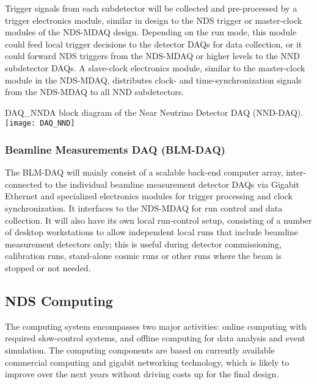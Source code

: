 Trigger signals from each subdetector will be collected and pre-processed by a 
trigger electronics module, similar in design to the NDS  trigger or master-clock modules 
of the NDS-MDAQ design. Depending on the run mode, this module could feed local 
trigger 
decisions to the detector DAQs for data collection, or it could forward NDS triggers 
from the NDS-MDAQ or higher levels to the NND subdetector DAQs.  A slave-clock electronics 
module, similar to the master-clock module in the NDS-MDAQ, distributes clock- and 
time-synchronization signals from the NDS-MDAQ to all NND subdetectors.


\begin{cdrfigure}{DAQ_NND}{A block diagram of the Near Neutrino Detector DAQ (NND-DAQ).}
\texttt{[image: DAQ\_NND]}
\end{cdrfigure}


\subsubsection{Beamline Measurements DAQ (BLM-DAQ)}

The BLM-DAQ will mainly consist of a scalable back-end 
computer array, inter-connected to the individual beamline measurement detector DAQs via 
Gigabit Ethernet and specialized electronics modules for trigger processing and clock 
synchronization. It interfaces to the NDS-MDAQ for run control and 
data collection. It will also have its own local run-control setup, consisting of a number 
of desktop workstations to allow independent local runs that include beamline measurement 
detectors only; this is useful during detector commissioning, calibration runs, stand-alone cosmic 
runs or other runs where the beam is stopped or not needed.


\subsection{NDS Computing}
\label{cdrsec:nd-gdaq-global-computing}

The computing system encompasses two major activities: online computing with required 
slow-control systems, and offline computing for data analysis and event simulation.
The computing components are based 
on currently available commercial computing and gigabit networking technology, which is 
likely to improve over the next years without driving costs up for the final design.  

